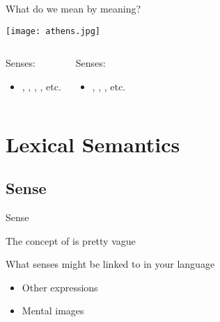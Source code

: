 \documentclass{beamer}
\newcommand{\subonetwo}{What do we mean by meaning?}
\newcommand{\subtwoone}{Sense}
\begin{document}

      \begin{frame}{\subonetwo}
        \begin{center}
          \texttt{[image: athens.jpg]}
        \end{center}
        \begin{columns}
            \begin{block}{}
              Senses:
              \begin{itemize}
                \item {}, , , , etc.
              \end{itemize}
            \end{block}
            \begin{block}{}
              Senses:
              \begin{itemize}
                \item {}, , , etc.
              \end{itemize}
            \end{block}
        \end{columns}
      \end{frame}

  \section{Lexical Semantics}
    \subsection{\subtwoone}
      \begin{frame}{\subtwoone}
        \begin{block}{}
          The concept of  is pretty vague
        \end{block}
        \begin{block}{What senses might be linked to in your language}
          \begin{itemize}
            \item Other expressions
            \item Mental images
          \end{itemize}
        \end{block}
      \end{frame}
\end{document}
